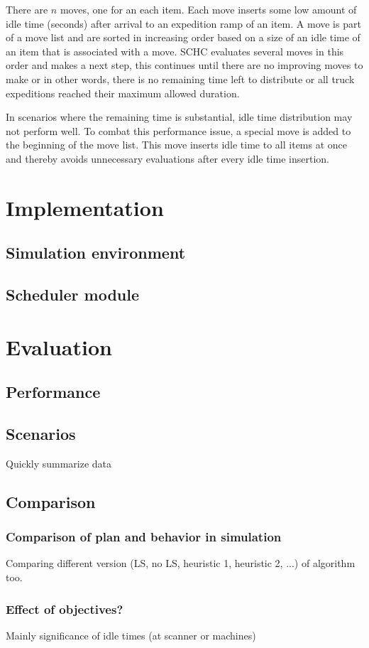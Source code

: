 \documentclass{ctuthesis}
\begin{document}
There are $n$ moves, one for an each item. Each move inserts some low amount of idle time (seconds) after arrival to an expedition ramp of an item. A move is part of a move list and are sorted in increasing order based on a size of an idle time of an item that is associated with a move. SCHC evaluates several moves in this order and makes a next step, this continues until there are no improving moves to make or in other words, there is no remaining time left to distribute or all truck expeditions reached their maximum allowed duration.

In scenarios where the remaining time is substantial, idle time distribution may not perform well. To combat this performance issue, a special move is added to the beginning of the move list. This move inserts idle time to all items at once and thereby avoids unnecessary evaluations after every idle time insertion.

\chapter{Implementation}
\section{Simulation environment}
\section{Scheduler module}
\chapter{Evaluation}
\label{ch:Evaluation}
\section{Performance}
\section{Scenarios}
Quickly summarize data 
\section{Comparison}
\subsection{Comparison of plan and behavior in simulation}
Comparing different version (LS, no LS, heuristic 1, heuristic 2, ...) of algorithm too.
\subsection{Effect of objectives?}
Mainly significance of idle times (at scanner or machines)
\end{document}
